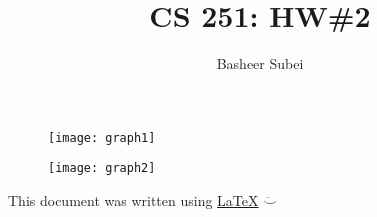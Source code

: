 \documentclass[11pt, twoside]{article}
\begin{document}


\title{CS 251: HW\#2}
\author{Basheer Subei}


\maketitle




\begin{figure}[H]
  \centering
  \texttt{[image: graph1]} 
\end{figure}
\begin{figure}[H]
  \centering
  \texttt{[image: graph2]} 
\end{figure}

\vfill
\begin{flushright} \tiny This document was written using \href{http://www.latex-project.org/}{\LaTeX} $\ddot\smile$ 
\end{flushright}
\end{document}
